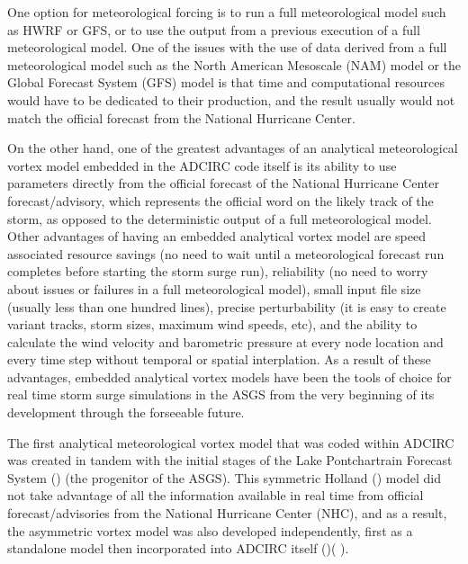 \documentclass[12pt]{article}
\begin{document}
One option for meteorological forcing is to run a full 
meteorological model such as HWRF or GFS, or to use the output from 
a previous execution of a full meteorological model. One of the 
issues with the use of data derived from a full meteorological model 
such as the North American Mesoscale (NAM) model or the Global 
Forecast System (GFS) model is that time and computational resources 
would have to be dedicated to their production, and the result 
usually would not match the official forecast from the National 
Hurricane Center. 

On the other hand, one of the greatest advantages of an analytical 
meteorological vortex model embedded in the ADCIRC code itself is 
its ability to use parameters directly from the official forecast of 
the National Hurricane Center forecast/advisory, which represents 
the official word on the likely track of the storm, as opposed to 
the deterministic output of a full meteorological model. Other 
advantages of having an embedded analytical vortex model are speed 
associated resource savings (no need to wait until a meteorological 
forecast run completes before starting the storm surge run), 
reliability (no need to worry about issues or failures in a full 
meteorological model), small input file size (usually less than one 
hundred lines), precise perturbability (it is easy to create variant 
tracks, storm sizes, maximum wind speeds, etc), and the ability to 
calculate the wind velocity and barometric pressure at every node 
location and every time step without temporal or spatial 
interplation. As a result of these advantages, embedded analytical 
vortex models have been the tools of choice for real time storm 
surge simulations in the ASGS from the very beginning of its 
development through the forseeable future.  

The first analytical meteorological vortex model that was coded 
within ADCIRC was created in tandem with the initial stages of the 
Lake Pontchartrain Forecast System (\cite{FlemingJG2008}) (the 
progenitor of the ASGS). This symmetric Holland (\cite 
{HollandGJ1980}) model did not take advantage of all the information 
available in real time from official forecast/advisories from the 
National Hurricane Center (NHC), and as a result, the asymmetric 
vortex model was also developed independently, first as a standalone 
model then incorporated into ADCIRC itself (\cite{MattocksC2006})(
\cite{MattocksC2008}). 
\end{document}
